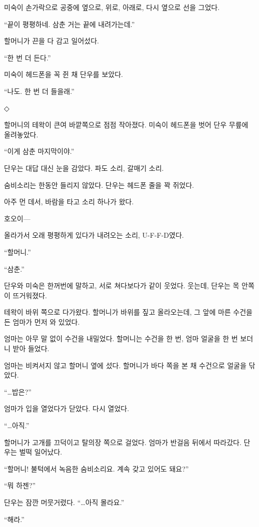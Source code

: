 \documentclass[
  korean,
  letterpaper,
  twoside,
  open=any,
  fontsize=12.5pt,
  headings=small]{scrbook}
\begin{document}
미숙이 손가락으로 공중에
옆으로, 위로, 아래로, 다시
옆으로 선을 그었다.

``끝이 평평하네. 삼춘 거는
끝에 내려가는데.''

할머니가 끈을 다 감고
일어섰다.

``한 번 더 든다.''

미숙이 헤드폰을 꼭 쥔 채
단우를 보았다.

``나도. 한 번 더 들을래.''

\begin{center}◇\end{center}\nopagebreak

할머니의 테왁이 큰여
바깥쪽으로 점점 작아졌다.
미숙이 헤드폰을 벗어 단우
무릎에 올려놓았다.

``이게 삼춘 마지막이야.''

단우는 대답 대신 눈을 감았다.
파도 소리, 갈매기 소리.

숨비소리는 한동안 들리지
않았다. 단우는 헤드폰 줄을 꽉
쥐었다.

아주 먼 데서, 바람을 타고 소리
하나가 왔다.

호오이---

올라가서 오래 평평하게 있다가
내려오는 소리,
\mbox{U-F-F-D였다.}

``할머니.''

``삼춘.''

단우와 미숙은 한꺼번에 말하고,
서로 쳐다보다가 같이 웃었다.
웃는데, 단우는 목 안쪽이
뜨거워졌다.

테왁이 바위 쪽으로 다가왔다.
할머니가 바위를 짚고
올라오는데, 그 앞에 마른
수건을 든 엄마가 먼저 와
있었다.

엄마는 아무 말 없이 수건을
내밀었다. 할머니는 수건을 한
번, 엄마 얼굴을 한 번 보더니
받아 들었다.

엄마는 비켜서지 않고 할머니
옆에 섰다. 할머니가 바다 쪽을
본 채 수건으로 얼굴을 닦았다.

``\ldots 밥은?''

엄마가 입을 열었다가 닫았다.
다시 열었다.

``\ldots 아직.''

할머니가 고개를 끄덕이고
탈의장 쪽으로 걸었다. 엄마가
반걸음 뒤에서 따라갔다. 단우는
벌떡 일어났다.

``할머니! 불턱에서 녹음한
숨비소리요. 계속 갖고 있어도
돼요?''

``뭐 하젠?''

단우는 잠깐 머뭇거렸다.
``\ldots 아직 몰라요.''

``해라.''
\end{document}
